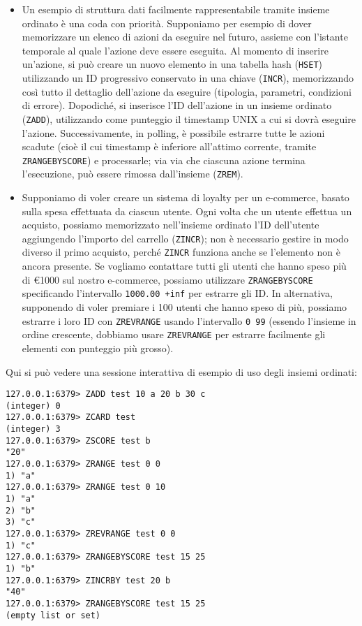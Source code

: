 \begin{itemize}
	\medskip

	\item Un esempio di struttura dati facilmente rappresentabile tramite insieme ordinato è una
	coda con priorità. Supponiamo per esempio di dover memorizzare un elenco di azioni da eseguire
	nel futuro, assieme con l'istante temporale al quale l'azione deve essere eseguita. Al momento
	di inserire un'azione, si può creare un nuovo elemento in una tabella hash (\verb|HSET|)
	utilizzando un ID progressivo conservato in una chiave (\verb|INCR|), memorizzando così tutto
	il dettaglio dell'azione da eseguire (tipologia, parametri, condizioni di errore). Dopodiché,
	si inserisce l'ID dell'azione in un insieme ordinato (\verb|ZADD|), utilizzando come punteggio
	il timestamp UNIX a cui si dovrà eseguire l'azione. Successivamente, in polling, è possibile
	estrarre tutte le azioni scadute (cioè il cui timestamp è inferiore all'attimo corrente,
	tramite \verb|ZRANGEBYSCORE|) e processarle; via via che ciascuna azione termina l'esecuzione,
	può essere rimossa dall'insieme (\verb|ZREM|).

	\item Supponiamo di voler creare un sistema di loyalty per un e-commerce, basato sulla spesa 
	effettuata da ciascun utente. Ogni volta che un utente effettua un acquisto, possiamo
	memorizzato nell'insieme ordinato l'ID dell'utente aggiungendo l'importo del carrello
	(\verb|ZINCR|); non è necessario gestire in modo diverso il primo acquisto, perché \verb|ZINCR|
	funziona anche se l'elemento non è ancora presente. Se vogliamo contattare tutti gli utenti che
	hanno speso più di €1000 sul nostro e-commerce, possiamo utilizzare \verb|ZRANGEBYSCORE|
	specificando l'intervallo \verb|1000.00 +inf| per estrarre gli ID. In alternativa, supponendo
	di voler premiare i 100 utenti che hanno speso di più, possiamo estrarre i loro ID con
	\verb|ZREVRANGE| usando l'intervallo \verb|0 99| (essendo l'insieme in ordine crescente,
	dobbiamo usare \verb|ZREVRANGE| per estrarre facilmente gli elementi con punteggio più grosso).
\end{itemize}

Qui si può vedere una sessione interattiva di esempio di uso degli insiemi ordinati:

\medskip
\begin{lstlisting}
127.0.0.1:6379> ZADD test 10 a 20 b 30 c
(integer) 0
127.0.0.1:6379> ZCARD test
(integer) 3
127.0.0.1:6379> ZSCORE test b
"20"
127.0.0.1:6379> ZRANGE test 0 0
1) "a"
127.0.0.1:6379> ZRANGE test 0 10
1) "a"
2) "b"
3) "c"
127.0.0.1:6379> ZREVRANGE test 0 0
1) "c"
127.0.0.1:6379> ZRANGEBYSCORE test 15 25
1) "b"
127.0.0.1:6379> ZINCRBY test 20 b
"40"
127.0.0.1:6379> ZRANGEBYSCORE test 15 25
(empty list or set)
\end{lstlisting}


